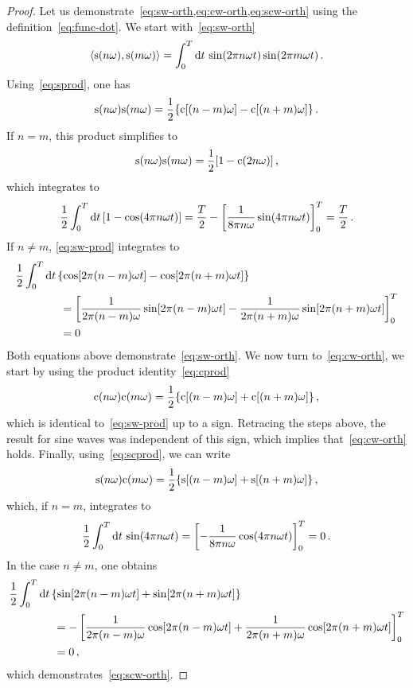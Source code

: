 \begin{proof}
  Let us demonstrate~\cref{eq:sw-orth,eq:cw-orth,eq:scw-orth} using the
  definition~\cref{eq:func-dot}. We start with~\cref{eq:sw-orth}
  \begin{equation}
    \braket{\mathrm{s}(n\omega),\mathrm{s}(m\omega)}=\int_{0}^{T}\mathrm{d} t\,
    \sin(2\pi n\omega t)\sin(2\pi m\omega t)\,.
  \end{equation}
  Using~\cref{eq:sprod}, one has
  \begin{equation}
    \mathrm{s}(n\omega)\mathrm{s}(m\omega)=\frac{1}{2}\{\mathrm{c}[(n-m)\omega]-\mathrm{c}[(n+m)\omega]\}\,.
    \label{eq:sw-prod}
  \end{equation}
  If $n=m$, this product simplifies to
  \begin{equation}
    \mathrm{s}(n\omega)\mathrm{s}(m\omega)=\frac{1}{2}[1-\mathrm{c}(2n\omega)]\,,
  \end{equation}
  which integrates to
  \begin{equation}
    \frac{1}{2}\int_{0}^{T}\mathrm{d} t\,[1-\cos(4\pi n\omega t)]=\frac{T}{2}-
    \left[\frac{1}{8\pi n\omega}\sin(4\pi n\omega t)\right]_0^T
    =\frac{T}{2}\,.
  \end{equation}
  If $n\neq m$, \cref{eq:sw-prod} integrates to
  \begin{align}
    &\frac{1}{2}\int_{0}^{T}\mathrm{d} t\,\{\cos[2\pi(n-m)\omega t]-\cos[2\pi(n+m)\omega t]\}\notag\\
    &\qquad\qquad=\left[\frac{1}{2\pi(n-m)\omega}\sin[2\pi(n-m)\omega t]
    -\frac{1}{2\pi(n+m)\omega}\sin[2\pi(n+m)\omega t]\right]_0^T\notag\\
    &\qquad\qquad=0
  \end{align}
  Both equations above demonstrate~\cref{eq:sw-orth}. We now turn to~\cref{eq:cw-orth}, we
  start by using the product identity~\cref{eq:cprod}
  \begin{equation}
    \mathrm{c}(n\omega)\mathrm{c}(m\omega)=\frac{1}{2}\{\mathrm{c}[(n-m)\omega]+\mathrm{c}[(n+m)\omega]\}\,,
  \end{equation}
  which is identical to~\cref{eq:sw-prod} up to a sign. Retracing the steps above, the
  result for sine waves was independent of this sign, which implies that~\cref{eq:cw-orth}
  holds. Finally, using~\cref{eq:scprod}, we can write
  \begin{equation}
    \mathrm{s}(n\omega)\mathrm{c}(m\omega)=\frac{1}{2}\{\mathrm{s}[(n-m)\omega]+\mathrm{s}[(n+m)\omega]\}\,,
  \end{equation}
  which, if $n=m$, integrates to
  \begin{equation}
    \frac{1}{2}\int_{0}^{T}\mathrm{d} t\,\sin(4\pi n\omega t)=
    \left[-\frac{1}{8\pi n\omega}\cos(4\pi n\omega t)\right]_0^T=0\,.
  \end{equation}
  In the case $n\neq m$, one obtains
  \begin{align}
    &\frac{1}{2}\int_{0}^{T}\mathrm{d} t\,\{\sin[2\pi(n-m)\omega t]+\sin[2\pi(n+m)\omega t]\}\notag\\
    &\qquad\qquad=-\left[\frac{1}{2\pi(n-m)\omega}\cos[2\pi(n-m)\omega t]
    +\frac{1}{2\pi(n+m)\omega}\cos[2\pi(n+m)\omega t]\right]_0^T\notag\\
    &\qquad\qquad=0\,,
  \end{align}
  which demonstrates~\cref{eq:scw-orth}.
\end{proof}
